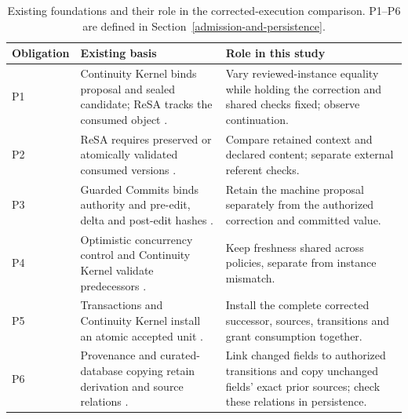 \begin{table}[tbp]
\caption{Existing foundations and their role in the corrected-execution comparison. P1--P6 are defined in Section~\ref{admission-and-persistence}.}\label{tab:obligation-positioning}
\centering\small
\begin{tabularx}{\textwidth}{@{}>{\raggedright\arraybackslash}p{}>{\raggedright\arraybackslash}p{}>{\raggedright\arraybackslash}X@{}}
\toprule
Obligation & Existing basis & Role in this study \\
\midrule
P1 & Continuity Kernel binds proposal and sealed candidate; ReSA tracks the consumed object \citep{continuity-kernel,zhu2026resa}. & Vary reviewed-instance equality while holding the correction and shared checks fixed; observe continuation. \\
P2 & ReSA requires preserved or atomically validated consumed versions \citep{zhu2026resa}. & Compare retained context and declared content; separate external referent checks. \\
P3 & Guarded Commits binds authority and pre-edit, delta and post-edit hashes \citep{bindschaedler2026guarded}. & Retain the machine proposal separately from the authorized correction and committed value. \\
P4 & Optimistic concurrency control and Continuity Kernel validate predecessors \citep{kung-occ,continuity-kernel}. & Keep freshness shared across policies, separate from instance mismatch. \\
P5 & Transactions and Continuity Kernel install an atomic accepted unit \citep{gray-transaction,continuity-kernel}. & Install the complete corrected successor, sources, transitions and grant consumption together. \\
P6 & Provenance and curated-database copying retain derivation and source relations \citep{buneman-provenance,buneman-curated}. & Link changed fields to authorized transitions and copy unchanged fields' exact prior sources; check these relations in persistence. \\
\bottomrule
\end{tabularx}
\end{table}
